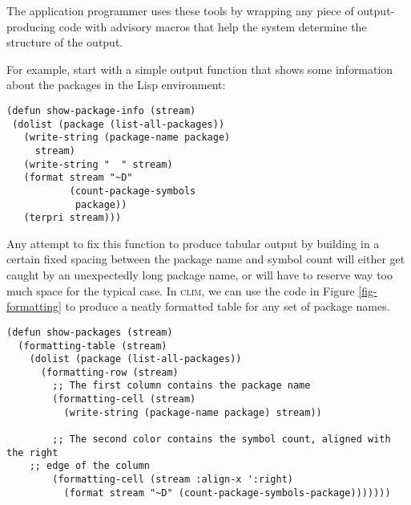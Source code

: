 \documentclass[twocolumn,a4paper]{article}
\newcommand {\CLIM}{\textsc{clim}}
\begin{document}
The application programmer uses these tools by wrapping any piece of
output-producing code with advisory macros that help the system
determine the structure of the output.

For example, start with a simple output function that shows some
information about the packages in the Lisp environment:
\lstset{style=inlinestyle}
\begin{lstlisting}
(defun show-package-info (stream)
 (dolist (package (list-all-packages)) 
   (write-string (package-name package) 
     stream)
   (write-string "  " stream) 
   (format stream "~D" 
           (count-package-symbols 
            package)) 
   (terpri stream)))
\end{lstlisting}
Any attempt to fix this function to produce tabular output by building
in a certain fixed spacing between the package name and symbol count
will either get caught by an unexpectedly long package name, or will
have to reserve way too much space for the typical case. In \CLIM{}, we
can use the code in Figure \ref{fig-formatting} to produce a neatly
formatted table for any set of package names.
\begin{figure*}
\lstset{style=framestyle}
\begin{lstlisting}
(defun show-packages (stream)
  (formatting-table (stream)
    (dolist (package (list-all-packages))
      (formatting-row (stream)
        ;; The first column contains the package name
        (formatting-cell (stream)
          (write-string (package-name package) stream))

        ;; The second color contains the symbol count, aligned with the right 
	;; edge of the column 
        (formatting-cell (stream :align-x ':right)
          (format stream "~D" (count-package-symbols-package)))))))
\end{lstlisting}
\caption{An output function that uses table formatting.}\label{fig-formatting}
\end{figure*}

\end{document}

